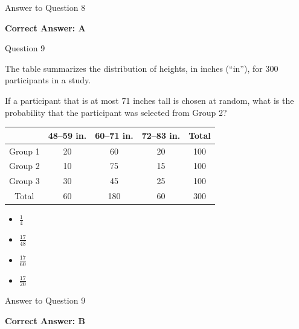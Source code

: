 \documentclass{beamer}
\begin{document}
\begin{frame}{Answer to Question 8}

\textbf{Correct Answer: A}

\end{frame}


\begin{frame}{Question 9}

The table summarizes the distribution of heights, in inches (“in”), for 300 participants in a study.

If a participant that is at most 71 inches tall is chosen at random, what is the probability that the participant was selected from Group 2?

\vspace{0.3cm}

\begin{tabular}{c|c|c|c|c}
 & 48--59 in. & 60--71 in. & 72--83 in. & Total\\
\hline
Group 1 & 20 & 60 & 20 & 100\\
Group 2 & 10 & 75 & 15 & 100\\
Group 3 & 30 & 45 & 25 & 100\\
\hline
Total & 60 & 180 & 60 & 300
\end{tabular}

\vspace{0.3cm}

\begin{itemize}
    \item[A.] $\frac14$
    \item[B.] $\frac{17}{48}$
    \item[C.] $\frac{17}{60}$
    \item[D.] $\frac{17}{20}$
\end{itemize}

\end{frame}

\begin{frame}{Answer to Question 9}

\textbf{Correct Answer: B}

\end{frame}

\end{document}
